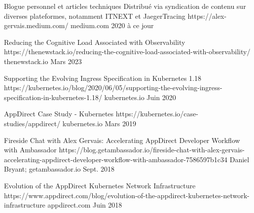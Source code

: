

\begin{cvhonors}


  \cvhonor
    {Blogue personnel et articles techniques} %
    {Distribué via syndication de contenu sur diverses plateformes, notamment ITNEXT et JaegerTracing } %
    {https://alex-gervais.medium.com/} %
    {medium.com} %
    {2020 à ce jour} %

  \cvhonor
    {Reducing the Cognitive Load Associated with Observability} %
    {} %
    {https://thenewstack.io/reducing-the-cognitive-load-associated-with-observability/} %
    {thenewstack.io} %
    {Mars 2023} %


  \cvhonor
    {Supporting the Evolving Ingress Specification in Kubernetes 1.18} %
    {} %
    {https://kubernetes.io/blog/2020/06/05/supporting-the-evolving-ingress-specification-in-kubernetes-1.18/} %
    {kubernetes.io} %
    {Juin 2020} %

  \cvhonor
    {AppDirect Case Study - Kubernetes} %
    {} %
    {https://kubernetes.io/case-studies/appdirect/} %
    {kubernetes.io} %
    {Mars 2019} %

  \cvhonor
    {Fireside Chat with Alex Gervais: Accelerating AppDirect Developer Workflow with Ambassador} %
    {} %
    {https://blog.getambassador.io/fireside-chat-with-alex-gervais-accelerating-appdirect-developer-workflow-with-ambassador-7586597b1c34} %
    {Daniel Bryant; getambassador.io} %
    {Sept. 2018} %

  \cvhonor
    {Evolution of the AppDirect Kubernetes Network Infrastructure} %
    {} %
    {https://www.appdirect.com/blog/evolution-of-the-appdirect-kubernetes-network-infrastructure} %
    {appdirect.com} %
    {Juin 2018} %

\end{cvhonors}


